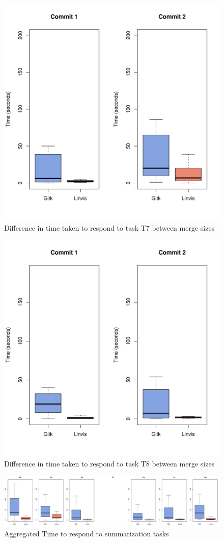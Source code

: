 \begin{figure}[htpb]
  \centering
  \includegraphics[width=0.5\linewidth]{Figures/evaluation/time/7.pdf}
  \caption{Difference in time taken to respond to task T7 between merge sizes}
  \label{fig:task_7_time}
\end{figure}

\begin{figure}[htpb]
  \centering
  \includegraphics[width=0.5\linewidth]{Figures/evaluation/time/8.pdf}
  \caption{Difference in time taken to respond to task T8 between merge sizes}
  \label{fig:task_8_time}
\end{figure}

\begin{figure}[htpb]
  \centering
  \includegraphics[width=0.9\linewidth]{Figures/evaluation/time.pdf}
  \caption{Aggregated Time to respond to summarization tasks}
  \label{fig:agg_time}
\end{figure}


